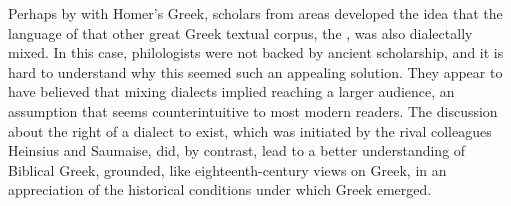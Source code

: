 Perhaps by  with Homer’s Greek, scholars from  areas developed the idea that the language of that other great Greek textual corpus, the , was also dialectally mixed. In this case, philologists were not backed by ancient scholarship, and it is hard to understand why this seemed such an appealing solution. They appear to have believed that mixing dialects implied reaching a larger audience, an assumption that seems counterintuitive to most modern readers. The discussion about the right of a  dialect to exist, which was initiated by the rival colleagues Heinsius and Saumaise, did, by contrast, lead to a better understanding of Biblical Greek, grounded, like eighteenth-century views on  Greek, in an appreciation of the historical conditions under which  Greek emerged.

